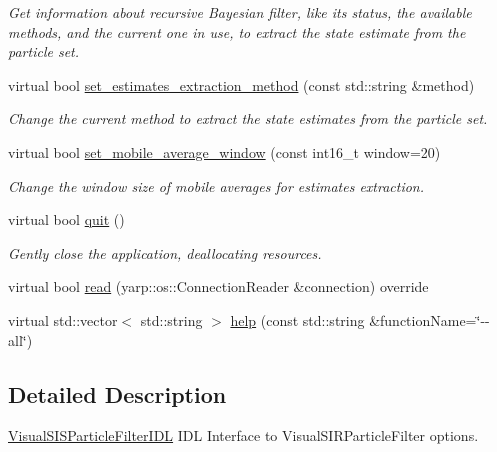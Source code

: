 \begin{DoxyCompactItemize}
\begin{DoxyCompactList}\small\item\em Get information about recursive Bayesian filter, like it\textquotesingle{}s status, the available methods, and the current one in use, to extract the state estimate from the particle set. \end{DoxyCompactList}\item 
virtual bool \hyperlink{classVisualSISParticleFilterIDL_ac5f296082bd83e1ee1b74e9af16e856a}{set\+\_\+estimates\+\_\+extraction\+\_\+method} (const std\+::string \&method)
\begin{DoxyCompactList}\small\item\em Change the current method to extract the state estimates from the particle set. \end{DoxyCompactList}\item 
virtual bool \hyperlink{classVisualSISParticleFilterIDL_a40d91826291e2bae76f4545254307577}{set\+\_\+mobile\+\_\+average\+\_\+window} (const int16\+\_\+t window=20)
\begin{DoxyCompactList}\small\item\em Change the window size of mobile averages for estimates extraction. \end{DoxyCompactList}\item 
virtual bool \hyperlink{classVisualSISParticleFilterIDL_a3f02a3df0d3dd545a6c62dc3a9f002b4}{quit} ()
\begin{DoxyCompactList}\small\item\em Gently close the application, deallocating resources. \end{DoxyCompactList}\item 
virtual bool \hyperlink{classVisualSISParticleFilterIDL_aade5ce77926faff0e94ffbf77f20c2c0}{read} (yarp\+::os\+::\+Connection\+Reader \&connection) override
\item 
virtual std\+::vector$<$ std\+::string $>$ \hyperlink{classVisualSISParticleFilterIDL_a3253f4dbc55e47183c04eb2e1054733c}{help} (const std\+::string \&function\+Name=\char`\"{}-\/-\/all\char`\"{})
\end{DoxyCompactItemize}


\subsection{Detailed Description}
\hyperlink{classVisualSISParticleFilterIDL}{Visual\+S\+I\+S\+Particle\+Filter\+I\+DL} I\+DL Interface to Visual\+S\+I\+R\+Particle\+Filter options. 

